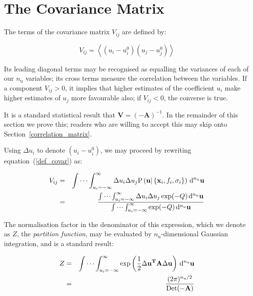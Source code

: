 \documentclass[a4paper,onecolumn,11pt]{book}
\begin{document}
\section{The Covariance Matrix}

The terms of the covariance matrix $V_{ij}$ are defined by:

\begin{equation}
\label{def_covar}
V_{ij} = \left< \left(u_i - u^0_i\right) \left(u_j - u^0_j\right) \right>
\end{equation}

\noindent Its leading diagonal terms may be recognised as equalling the
variances of each of our $n_\mathrm{u}$ variables; its cross terms measure the
correlation between the variables. If a component $V_{ij} > 0$, it implies that
higher estimates of the coefficient $u_i$ make higher estimates of $u_j$ more
favourable also; if $V_{ij} < 0$, the converse is true.

It is a standard statistical result that $\mathbf{V} = (-\mathbf{A})^{-1}$. In
the remainder of this section we prove this; readers who are willing to accept
this may skip onto Section~\ref{correlation_matrix}.

Using $\Delta u_i$ to denote $\left(u_i - u^0_i\right)$, we may proceed by
rewriting equation~(\ref{def_covar}) as:

\begin{eqnarray}
V_{ij} & = & \idotsint_{u_i=-\infty}^{\infty}
\Delta u_i \Delta u_j
\mathrm{P}\left(
\mathbf{u} | \left\{ \mathbf{x}_i, f_i, \sigma_i \right\} \right)
\,\mathrm{d}^{n_\mathrm{u}}\mathbf{u} \\
 & = & \frac{
\idotsint_{u_i=-\infty}^{\infty} \Delta u_i \Delta u_j \exp(-Q) \,\mathrm{d}^{n_\mathrm{u}}\mathbf{u}
}{
\idotsint_{u_i=-\infty}^{\infty} \exp(-Q) \,\mathrm{d}^{n_\mathrm{u}}\mathbf{u}
}
\nonumber
\end{eqnarray}

The normalisation factor in the denominator of this expression, which we denote
as $Z$, the \textit{partition function}, may be evaluated by
$n_\mathrm{u}$-dimensional Gaussian integration, and is a standard result:

\begin{eqnarray}
Z & = & \idotsint_{u_i=-\infty}^{\infty} \exp\left(\frac{1}{2} \Delta \mathbf{u}^\mathbf{T} \mathbf{A} \Delta \mathbf{u} \right) \,\mathrm{d}^{n_\mathrm{u}}\mathbf{u} \\
& = & \frac{(2\pi)^{n_\mathrm{u}/2}}{\mathrm{Det}(\mathbf{-A})} \nonumber
\end{eqnarray}
\end{document}
